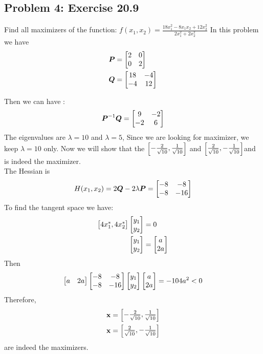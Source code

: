 \documentclass{article}
\begin{document}
 
  
\hypertarget{}{}
\subsection*{{Problem 4: Exercise 20.9}}
\label{}
Find all maximizers of the function: $f(x_1, x_2) = \frac{18x_1^2-8x_1x_2 + 12x_2^2}{2x_1^2 + 2x_2^2 } $ 
In this problem we have 
\begin{align*} 
\boldsymbol{P} & = \begin{bmatrix}  2 & 0 \\ 0 & 2  \end{bmatrix}  \\
\boldsymbol{Q} & = \begin{bmatrix} 18 & -4 \\ -4 & 12 \end{bmatrix} \\
\end{align*} 

Then we can have : \\ 
\begin{align*} 
\boldsymbol{P}^{-1}\boldsymbol{Q} = \begin{bmatrix} 9 & -2 \\ -2 & 6  \end{bmatrix} \\
\end{align*} 
The eigenvalues are $\lambda = 10 $ and $\lambda = 5$, 
Since we are looking for maximizer, we keep $\lambda=10$ only. 
Now we will show that the $\begin{bmatrix} -\frac{2}{\sqrt{10}},  \frac{1}{\sqrt{10} } \end{bmatrix}$  and  $\begin{bmatrix} \frac{2}{\sqrt{10}},  -\frac{1}{\sqrt{10} } \end{bmatrix}$and is indeed the maximizer.\\
The Hessian is \begin{align*} 
H(x_1, x_2) = 2\boldsymbol{Q} - 2\lambda\boldsymbol{P}  = \begin{bmatrix} -8 & -8 \\ -8 & -16  \end{bmatrix} 
\end{align*}
 To find the tangent space we have:  \begin{align*} 
 \begin{bmatrix} 4x^*_1, 4x^*_2 \end{bmatrix} \begin{bmatrix} y_1 \\ y_2 \end{bmatrix} &=  0 \\
\begin{bmatrix} y_1 \\ y_2  \end{bmatrix} &= \begin{bmatrix} a \\ 2a \end{bmatrix}  
\end{align*}
Then \begin{align*} 
\begin{bmatrix} a & 2a \end{bmatrix} \begin{bmatrix} -8 & -8 \\ -8 & -16  \end{bmatrix}  \begin{bmatrix} y_1 \\ y_2 \end{bmatrix}  \begin{bmatrix} a \\ 2a \end{bmatrix} = -104a^2 <0 
\end{align*}
Therefore, \begin{align*} 
 \boldsymbol{\mathrm{x}} & =  \begin{bmatrix} -\frac{2}{\sqrt{10}},  \frac{1}{\sqrt{10} } \end{bmatrix} \\
 \boldsymbol{\mathrm{x}} & =  \begin{bmatrix} \frac{2}{\sqrt{10}},  -\frac{1}{\sqrt{10} } \end{bmatrix} 
\end{align*}
are indeed the maximizers. 
\end{document}
